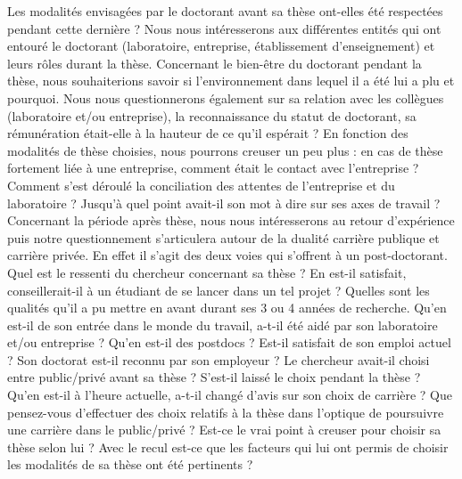 \documentclass[12pt]{article}
\begin{document}
Les modalités envisagées par le doctorant avant sa thèse ont-elles été respectées pendant cette dernière ? Nous nous intéresserons aux différentes entités qui ont entouré le doctorant (laboratoire, entreprise, établissement d’enseignement) et leurs rôles durant la thèse. 
Concernant le bien-être du doctorant pendant la thèse, nous souhaiterions savoir si l’environnement dans lequel il a été lui a plu et pourquoi. Nous nous questionnerons également sur sa relation avec les collègues (laboratoire et/ou entreprise), la reconnaissance du statut de doctorant, sa rémunération était-elle à la hauteur de ce qu’il espérait ? 
En fonction des modalités de thèse choisies, nous pourrons creuser un peu plus : en cas de thèse fortement liée à une entreprise, comment était le contact avec l’entreprise ? Comment s’est déroulé la conciliation des attentes de l’entreprise et du laboratoire ? Jusqu'à quel point avait-il son mot à dire sur ses axes de travail ?
Concernant la période après thèse, nous nous intéresserons au retour d’expérience puis notre questionnement s’articulera autour de la dualité carrière publique et carrière privée. En effet il s'agit des deux voies qui s’offrent à un post-doctorant.
Quel est le ressenti du chercheur concernant sa thèse ? En est-il satisfait, conseillerait-il à un étudiant de se lancer dans un tel projet ? Quelles sont les qualités qu’il a pu mettre en avant durant ses 3 ou 4 années de recherche.
Qu'en est-il de son entrée dans le monde du travail, a-t-il été aidé par son laboratoire et/ou entreprise ? Qu'en est-il des postdocs ? Est-il satisfait de son emploi actuel ? Son doctorat est-il reconnu par son employeur ?
Le chercheur avait-il choisi entre public/privé avant sa thèse ? S'est-il laissé le choix pendant la thèse ? Qu'en est-il à l’heure actuelle, a-t-il changé d’avis sur son choix de carrière ? Que pensez-vous d'effectuer des choix relatifs à la thèse dans l'optique de poursuivre une carrière dans le public/privé ?
Est-ce le vrai point à creuser pour choisir sa thèse selon lui ? Avec le recul est-ce que les facteurs qui lui ont permis de choisir les modalités de sa thèse ont été pertinents ?


\end{document}
